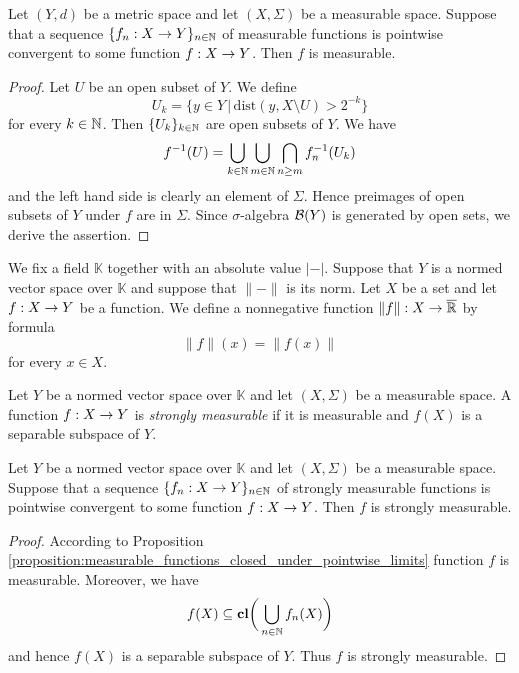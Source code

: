 \begin{proposition}\label{proposition:measurable_functions_closed_under_pointwise_limits}
    Let $(Y,d)$ be a metric space and let $(X,\Sigma)$ be a measurable space. Suppose that a sequence $\{f_n:X\rightarrow Y\}_{n\in {\mathbb N}}$ of measurable functions is pointwise convergent to some function $f:X\rightarrow Y$. Then $f$ is measurable.
\end{proposition}
\begin{proof}
    Let $U$ be an open subset of $Y$. We define
    $$U_k = \big\{y \in Y\,\big|\,\mathrm{dist}\left(y,X\setminus U\right) > 2^{-k}\big\}$$
    for every $k\in {\mathbb N}$. Then $\{U_k\}_{k\in {\mathbb N}}$ are open subsets of $Y$. We have
    $$f^{-1}(U) =\bigcup_{k\in {\mathbb N}}\bigcup_{m\in {\mathbb N}}\bigcap_{n\geq m}f_n^{-1}(U_k)$$
    and the left hand side is clearly an element of $\Sigma$. Hence preimages of open subsets of $Y$ under $f$ are in $\Sigma$. Since $\sigma$-algebra ${\mathcal B}(Y)$ is generated by open sets, we derive the assertion.
\end{proof}
\noindent
We fix a field $\mathbb{K}$ together with an absolute value $|-|$. Suppose that $Y$ is a normed vector space over $\mathbb{K}$ and suppose that $\lVert-\rVert$ is its norm. Let $X$ be a set and let $f:X\rightarrow Y$ be a function. We define a nonnegative function $\lVert f \rVert:X\rightarrow \overline{{\mathbb R}}$ by formula
$$\lVert f\rVert (x) = \lVert f(x) \rVert$$
for every $x\in X$.

\begin{definition}
    Let $Y$ be a normed vector space over $\mathbb{K}$ and let $(X,\Sigma)$ be a measurable space. A function $f:X\rightarrow Y$ is \textit{strongly measurable} if it is measurable and $f(X)$ is a separable subspace of $Y$.
\end{definition}

\begin{proposition}\label{proposition:strongly_measurable_functions_closed_under_pointwise_limits}
    Let $Y$ be a normed vector space over $\mathbb{K}$ and let $(X,\Sigma)$ be a measurable space. Suppose that a sequence $\{f_n:X\rightarrow Y\}_{n\in {\mathbb N}}$ of strongly measurable functions is pointwise convergent to some function $f:X\rightarrow Y$. Then $f$ is strongly measurable.
\end{proposition}
\begin{proof}
    According to Proposition \ref{proposition:measurable_functions_closed_under_pointwise_limits} function $f$ is measurable. Moreover, we have
    $$f(X) \subseteq \mathbf{cl}\bigg(\bigcup_{n\in {\mathbb N}}f_n(X)\bigg)$$
    and hence $f(X)$ is a separable subspace of $Y$. Thus $f$ is strongly measurable.
\end{proof}

